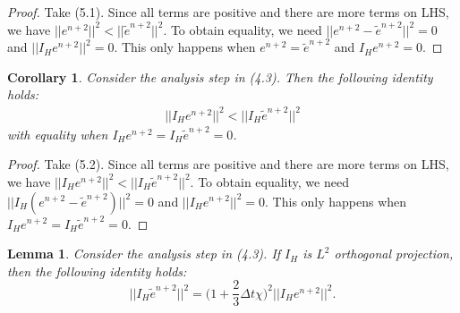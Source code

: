 \documentclass[11pt,a4paper]{article}
\newtheorem{corollary}{Corollary}[theorem]
\newtheorem{lemma}[theorem]{Lemma}
\begin{document}
\begin{proof}
    Take (5.1). Since all terms are positive and there are more terms on LHS, we have $||e^{n+2}||^2<||\tilde{e}^{n+2}||^2$. To obtain equality, we need $||e^{n+2}-\tilde{e}^{n+2}||^2=0$ and $||I_He^{n+2}||^2=0$. This only happens when $e^{n+2}=\tilde{e}^{n+2}$ and $I_He^{n+2}=0$.
\end{proof}

\begin{corollary}
    Consider the analysis step in (4.3). Then the following identity holds:
    \begin{align}
        ||I_He^{n+2}||^2< ||I_H\tilde{e}^{n+2}||^2
    \end{align}
    with equality when $I_He^{n+2}=I_H\tilde{e}^{n+2}=0$.
\end{corollary}

\begin{proof}
    Take (5.2). Since all terms are positive and there are more terms on LHS, we have $||I_He^{n+2}||^2<||I_H\tilde{e}^{n+2}||^2$. To obtain equality, we need $||I_H(e^{n+2}-\tilde{e}^{n+2})||^2=0$ and $||I_He^{n+2}||^2=0$. This only happens when $I_He^{n+2}=I_H\tilde{e}^{n+2}=0$.
\end{proof}

\begin{lemma}
    Consider the analysis step in (4.3). If $I_H$ is $L^2$ orthogonal projection, then the following identity holds:
    \begin{equation}
        ||I_H\tilde{e}^{n+2}||^2=\Bigg(1+\frac{2}{3}\Delta t\chi\Bigg)^2||I_He^{n+2}||^2.
    \end{equation}
\end{lemma}
\end{document}
